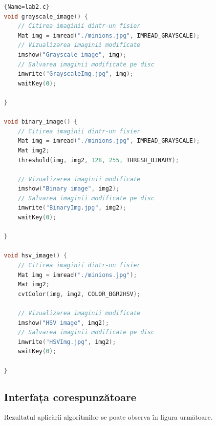 \documentclass{amsart}
\begin{document}
\begin{lstlisting}[language=C++]{Name=lab2.c}
void grayscale_image() {
	// Citirea imaginii dintr-un fisier
	Mat img = imread("./minions.jpg", IMREAD_GRAYSCALE);
	// Vizualizarea imaginii modificate
	imshow("Grayscale image", img);
	// Salvarea imaginii modificate pe disc 
	imwrite("GrayscaleImg.jpg", img);
	waitKey(0);

}

void binary_image() {
	// Citirea imaginii dintr-un fisier
	Mat img = imread("./minions.jpg", IMREAD_GRAYSCALE);
	Mat img2;
	threshold(img, img2, 128, 255, THRESH_BINARY);

	// Vizualizarea imaginii modificate
	imshow("Binary image", img2);
	// Salvarea imaginii modificate pe disc 
	imwrite("BinaryImg.jpg", img2);
	waitKey(0);

}

void hsv_image() {
	// Citirea imaginii dintr-un fisier
	Mat img = imread("./minions.jpg");
	Mat img2;
	cvtColor(img, img2, COLOR_BGR2HSV);

	// Vizualizarea imaginii modificate
	imshow("HSV image", img2);
	// Salvarea imaginii modificate pe disc 
	imwrite("HSVImg.jpg", img2);
	waitKey(0);

}
 \end{lstlisting}

\subsection{Interfața corespunzătoare}

Rezultatul aplic\u{a}rii algoritmilor se poate observa \^{i}n figura următoare. 
\end{document}
